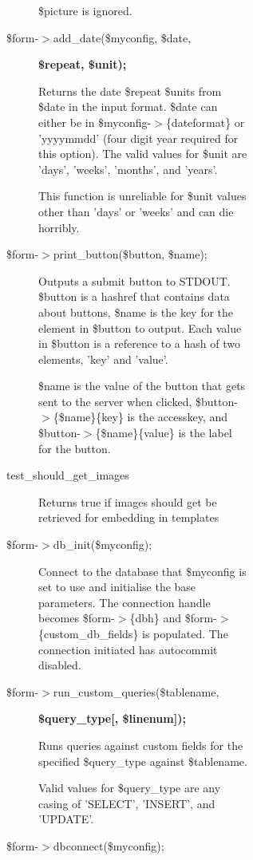 \begin{description}
\begin{description}
\begin{description}
\begin{description}
\begin{description}
\begin{description}
\$picture is ignored.


\item[{\$form-$>$add\_date(\$myconfig, \$date,}] \textbf{\$repeat, \$unit);}

Returns the date \$repeat \$units from \$date in the input format.  \$date can
either be in \$myconfig-$>$\{dateformat\} or 'yyyymmdd' (four digit year required for
this option).  The valid values for \$unit are 'days', 'weeks', 'months', and
'years'.



This function is unreliable for \$unit values other than 'days' or 'weeks' and
can die horribly.


\item[{\$form-$>$print\_button(\$button, \$name);}] \mbox{}

Outputs a submit button to STDOUT.  \$button is a hashref that contains data
about buttons, \$name is the key for the element in \$button to output.  Each
value in \$button is a reference to a hash of two elements, 'key' and 'value'.



\$name is the value of the button that gets sent to the server when clicked,
\$button-$>$\{\$name\}\{key\} is the accesskey, and \$button-$>$\{\$name\}\{value\} is the label
for the button.


\item[{test\_should\_get\_images}] \mbox{}

Returns true if images should get be retrieved for embedding in templates


\item[{\$form-$>$db\_init(\$myconfig);}] \mbox{}

Connect to the database that \$myconfig is set to use and initialise the base
parameters.  The connection handle becomes \$form-$>$\{dbh\} and
\$form-$>$\{custom\_db\_fields\} is populated.  The connection initiated has
autocommit disabled.


\item[{\$form-$>$run\_custom\_queries(\$tablename,}] \textbf{\$query\_type[, \$linenum]);}

Runs queries against custom fields for the specified \$query\_type against
\$tablename.



Valid values for \$query\_type are any casing of 'SELECT', 'INSERT', and 'UPDATE'.


\item[{\$form-$>$dbconnect(\$myconfig);}] \mbox{}


\end{description}
\end{description}
\end{description}
\end{description}
\end{description}
\end{description}
